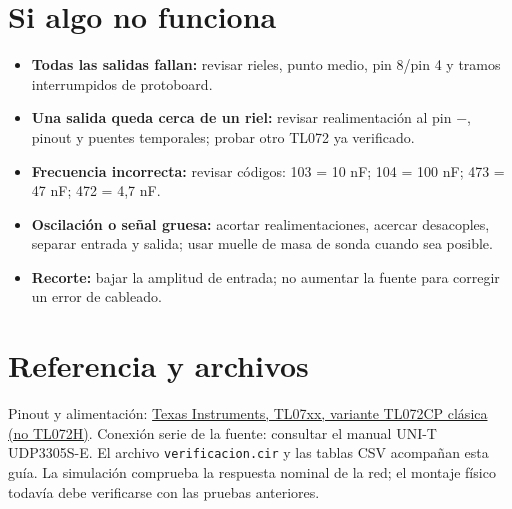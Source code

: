 \documentclass[10pt,a4paper]{article}
\begin{document}
\section{Si algo no funciona}
\begin{itemize}
\item \textbf{Todas las salidas fallan:} revisar rieles, punto medio, pin 8/pin 4 y tramos interrumpidos de protoboard.
\item \textbf{Una salida queda cerca de un riel:} revisar realimentación al pin −, pinout y puentes temporales; probar otro TL072 ya verificado.
\item \textbf{Frecuencia incorrecta:} revisar códigos: 103 = 10 nF; 104 = 100 nF; 473 = 47 nF; 472 = 4,7 nF.
\item \textbf{Oscilación o señal gruesa:} acortar realimentaciones, acercar desacoples, separar entrada y salida; usar muelle de masa de sonda cuando sea posible.
\item \textbf{Recorte:} bajar la amplitud de entrada; no aumentar la fuente para corregir un error de cableado.
\end{itemize}
\section{Referencia y archivos}
Pinout y alimentación: \href{https://www.ti.com/lit/ds/symlink/tl072.pdf}{Texas Instruments, TL07xx, variante TL072CP clásica (no TL072H)}. Conexión serie de la fuente: consultar el manual UNI-T UDP3305S-E. El archivo \texttt{verificacion.cir} y las tablas CSV acompañan esta guía. La simulación comprueba la respuesta nominal de la red; el montaje físico todavía debe verificarse con las pruebas anteriores.

\end{document}
